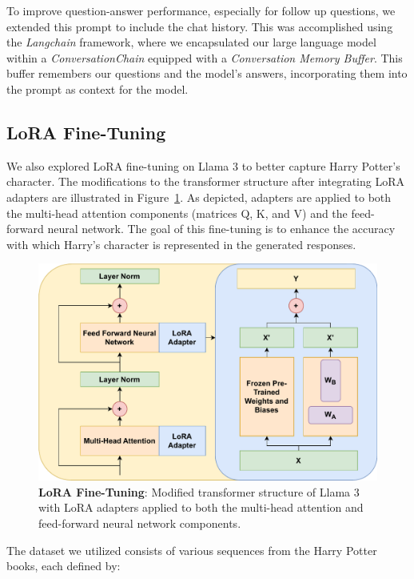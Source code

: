 \documentclass[fleqn,moreauthors,10pt]{ds_report}
\begin{document}
    To improve question-answer performance, especially for follow up questions, we extended this prompt to include the chat history. This was accomplished using the \textit{Langchain} framework, where we encapsulated our large language model within a \textit{ConversationChain} equipped with a \textit{Conversation Memory Buffer}. This buffer remembers our questions and the model's answers, incorporating them into the prompt as context for the model.
    
    \subsection*{LoRA Fine-Tuning}

    We also explored LoRA fine-tuning on Llama 3 to better capture Harry Potter's character. The modifications to the transformer structure after integrating LoRA adapters are illustrated in Figure~\ref{fig:lora}. As depicted, adapters are applied to both the multi-head attention components (matrices Q, K, and V) and the feed-forward neural network. The goal of this fine-tuning is to enhance the accuracy with which Harry's character is represented in the generated responses.

    \begin{figure}[!htb]
        \centering
        \includegraphics[width=\linewidth]{fig/lora.drawio.pdf}
        \caption{\textbf{LoRA Fine-Tuning}: Modified transformer structure of Llama 3 with LoRA adapters applied to both the multi-head attention and feed-forward neural network components.}
        \label{fig:lora}
    \end{figure}
    
    The dataset we utilized consists of various sequences from the Harry Potter books, each defined by:
\end{document}
